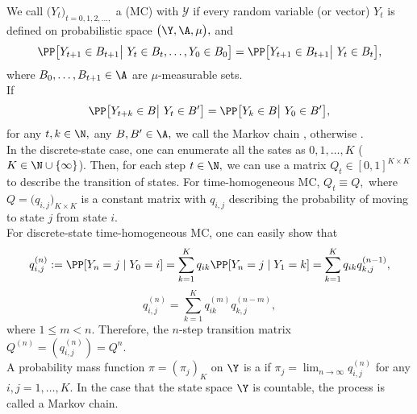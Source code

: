     	We call $\big(Y_t\big)_{t=0,1,2,\ldots,}$ a  (MC)
    	with  $\mathcal{Y}$ if every random variable 
	(or vector) $Y_t$ is defined on probabilistic space 
    	$\big(\Y, \A, \mu\big),$ and 
    	\[
    	\PP\big[Y_{t+1}\in B_{t+1}\big|\ Y_{t}\in B_{t}, \ldots, Y_0\in B_{0}\big]=\PP \big[Y_{t+1}\in B_{t+1}\big|\ Y_{t}\in B_{t}\big],
    	\]
	where $B_0,\ldots, B_{t+1}\in \A$ are $\mu$-measurable sets.\\[1ex]
	
	\hspace{0.5cm}If 
	\[
    	\PP \big[Y_{t+k}\in B\big|\ Y_{t}\in B'\big]=\PP \big[Y_{k}\in B\big|\ Y_{0}\in B'\big],
    	\] 
	for any $t,k\in \N,$ any $B,B'\in \A,$ we call the Markov chain
	, otherwise . \\[1ex]
	
    	In the discrete-state case, one can enumerate all the sates as
	$0,1,\ldots,K$ ($K\in \N\cup \{\infty\}$). Then, for each step 
	$t\in \N,$ we can use a matrix $Q_t\in [0,1]^{K\times K}$ to 
	describe the transition of states. For time-homogeneous MC, 
	$Q_t\equiv Q,$ where $Q=\big(q_{i,j}\big)_{K\times K}$ is a 
	constant matrix with $q_{i,j}$ describing the probability of 
	moving to state $j$ from state $i.$\\[1ex]
	
	\hspace{0.5cm}For discrete-state time-homogeneous MC, one
	can easily show that 
	\[
	q^{(n)}_{i,j}:=\PP[Y_{n}=j\mid Y_{0}=i]=\sum_{k=1}^{K}
	q_{ik}\PP[Y_{n}=j\mid Y_{1}=k]=\sum_{k=1}^{K}
	q_{ik}q^{(n-1)}_{k,j},	
	\]
	\[
	q^{(n)}_{i,j}=\sum_{k=1}^{K}
	q^{(m)}_{ik}q^{(n-m)}_{k,j},		
	\]
	where $1\le m<n.$ Therefore, the $n$-step transition matrix
	$Q^{(n)}=(q_{i,j}^{(n)})=Q^n.$\\[1ex]
	
	\hspace{0.5cm}A probability mass function $\pi=(\pi_j)_K$ on $\Y$ is a 
	 if 
	$
	\pi_j=\lim_{n\to \infty} q_{i,j}^{(n)}
	$
	for any $i,j=1,\ldots, K.$
\hspace{0.5cm}In the case that the state space $\Y$ is countable, the 
process is called a  Markov chain. 

